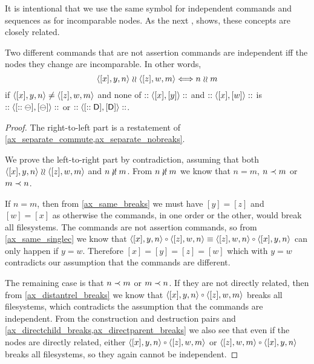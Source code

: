 It is intentional that we use the same symbol for independent commands
and sequences as for incomparable nodes. As the next
,
shows, these concepts are closely related.

\begin{mylem}
Two different commands that are not assertion commands are independent 
iff the nodes they change are incomparable. In other words,
\[ \langle{[x],y,n}\rangle\mathrel{\wr\wr}\langle{[z],w,m}\rangle \Longleftrightarrow n\mathrel{\wr\wr} m \]
if $\langle{[x],y,n}\rangle\neq\langle{[z],w,m}\rangle$ and none of $::\langle{[x],[y]}\rangle::$ and $::\langle{[x],[w]}\rangle::$ is $::\langle{[::\ominus],[\ominus]}\rangle::$ or $::\langle{[::\mathsf{D}],[\mathsf{D}]}\rangle::$.
\end{mylem}
\begin{proof}
The right-to-left part is a restatement of
\cref{ax_separate_commute,ax_separate_nobreaks}.

We prove the left-to-right part by contradiction,
assuming that both $\langle{[x],y,n}\rangle\mathrel{\wr\wr}\langle{[z],w,m}\rangle$ and $n\nunrel m$.
From $n\nunrel m$
we know that $n=m$, $n\prec m$ or $m\prec n$.

If $n=m$, then from \cref{ax_same_breaks} we must have $[y]=[z]$ and $[w]=[x]$
as otherwise the commands, in one order or the other, would break all filesystems.
The commands are not assertion commands, so from \cref{ax_same_singlec}
we know that $\cxynv\cc\czwnv\equiv\czwnv\cc\cxynv$ can only happen if $y=w$.
Therefore $[x]=[y]=[z]=[w]$ which with $y=w$ contradicts our assumption that the commands are different.

The remaining case is that $n\prec m$ or $m\prec n$.
If they are not directly related,
then from \cref{ax_distantrel_breaks} we know that
$\cxynv\cc\czwmv$ breaks all filesystems,
which contradicts the assumption that the commands are independent.
From the construction and destruction pairs and 
\cref{ax_directchild_breaks,ax_directparent_breaks} we also see that
even if the nodes are directly related, either
$\cxynv\cc\czwmv$ or $\czwmv\cc\cxynv$ 
breaks all filesystems, so they again cannot be independent.
\end{proof}

